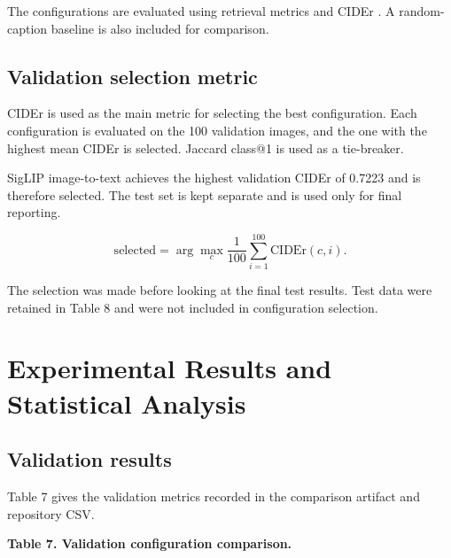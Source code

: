 \documentclass{article}
\begin{document}
The configurations are evaluated using retrieval metrics and CIDEr \cite{vedantam_cider_2015}.
A random-caption baseline is also included for comparison.

\subsection{Validation selection
metric}\label{validation-selection-metric}

CIDEr \cite{vedantam_cider_2015} is used as the main metric for selecting the best
configuration. Each configuration is evaluated on the 100
validation images, and the one with the highest mean CIDEr is
selected. Jaccard class@1 is used as a tie-breaker.

SigLIP image-to-text achieves the highest validation CIDEr of
0.7223 and is therefore selected. The test set is kept separate
and is used only for final reporting.


\[
\text{selected} = \arg\max_c
\frac{1}{100}\sum_{i=1}^{100}\mathrm{CIDEr}(c,i).
\]

The selection was made before looking at the final test results. Test
data were retained in Table 8 and were not included in
configuration selection.

\section{Experimental Results and Statistical
Analysis}\label{experimental-results-and-statistical-analysis}

\subsection{Validation results}\label{validation-results}

Table 7 gives the validation metrics
recorded in the comparison artifact and repository CSV.

\begin{center}
\textbf{Table 7. Validation configuration comparison.}
\end{center}

\begin{table}[htbp]
\centering
{}
\end{table}
\end{document}
